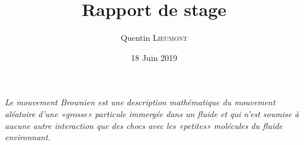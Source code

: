 \documentclass[a4paper,10pt]{report}
\title{Rapport de stage}
\author{Quentin \textsc{Lieumont}}
\date{18 Juin 2019}
\begin{document}
\maketitle

\newpage

\tableofcontents

\begin{center}
    \textit{Le mouvement Brownien est une description mathématique du mouvement aléatoire d'une «grosse» particule immergée dans un fluide et qui n'est soumise à aucune autre interaction que des chocs avec les «petites» molécules du fluide environnant.} \cite{bla}
\end{center}

\newpage




\end{document}
